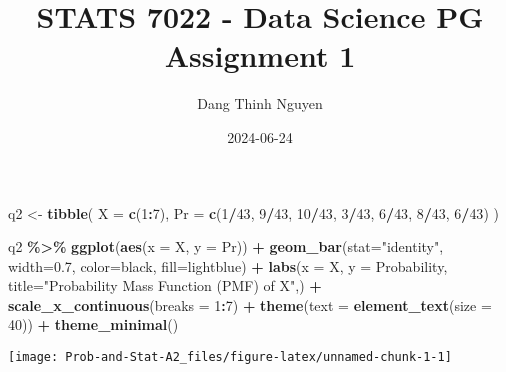 \documentclass[
]{article}
\title{STATS 7022 - Data Science PG Assignment 1}
\author{Dang Thinh Nguyen}
\date{2024-06-24}
\newenvironment{Shaded}{\begin{snugshade}}{\end{snugshade}}
\newcommand{\AttributeTok}[1]{\textcolor[rgb]{0.13,0.29,0.53}{#1}}
\newcommand{\DecValTok}[1]{\textcolor[rgb]{0.00,0.00,0.81}{#1}}
\newcommand{\FloatTok}[1]{\textcolor[rgb]{0.00,0.00,0.81}{#1}}
\newcommand{\FunctionTok}[1]{\textcolor[rgb]{0.13,0.29,0.53}{\textbf{#1}}}
\newcommand{\NormalTok}[1]{#1}
\newcommand{\OtherTok}[1]{\textcolor[rgb]{0.56,0.35,0.01}{#1}}
\newcommand{\SpecialCharTok}[1]{\textcolor[rgb]{0.81,0.36,0.00}{\textbf{#1}}}
\newcommand{\StringTok}[1]{\textcolor[rgb]{0.31,0.60,0.02}{#1}}
\begin{document}
\maketitle

\begin{Shaded}
\begin{Highlighting}[]
\NormalTok{q2 }\OtherTok{\textless{}{-}} \FunctionTok{tibble}\NormalTok{(}
  \AttributeTok{X =} \FunctionTok{c}\NormalTok{(}\DecValTok{1}\SpecialCharTok{:}\DecValTok{7}\NormalTok{),}
  \AttributeTok{Pr =} \FunctionTok{c}\NormalTok{(}\DecValTok{1}\SpecialCharTok{/}\DecValTok{43}\NormalTok{, }\DecValTok{9}\SpecialCharTok{/}\DecValTok{43}\NormalTok{, }\DecValTok{10}\SpecialCharTok{/}\DecValTok{43}\NormalTok{, }\DecValTok{3}\SpecialCharTok{/}\DecValTok{43}\NormalTok{, }\DecValTok{6}\SpecialCharTok{/}\DecValTok{43}\NormalTok{, }\DecValTok{8}\SpecialCharTok{/}\DecValTok{43}\NormalTok{, }\DecValTok{6}\SpecialCharTok{/}\DecValTok{43}\NormalTok{)}
\NormalTok{)}

\NormalTok{q2 }\SpecialCharTok{\%\textgreater{}\%}
  \FunctionTok{ggplot}\NormalTok{(}\FunctionTok{aes}\NormalTok{(}\AttributeTok{x =}\NormalTok{ X, }\AttributeTok{y =}\NormalTok{ Pr)) }\SpecialCharTok{+}
  \FunctionTok{geom\_bar}\NormalTok{(}\AttributeTok{stat=}\StringTok{"identity"}\NormalTok{, }\AttributeTok{width=}\FloatTok{0.7}\NormalTok{, }\AttributeTok{color=}\StringTok{\textquotesingle{}black\textquotesingle{}}\NormalTok{, }\AttributeTok{fill=}\StringTok{\textquotesingle{}lightblue\textquotesingle{}}\NormalTok{) }\SpecialCharTok{+}
  \FunctionTok{labs}\NormalTok{(}\AttributeTok{x =} \StringTok{\textquotesingle{}X\textquotesingle{}}\NormalTok{,}
       \AttributeTok{y =} \StringTok{\textquotesingle{}Probability\textquotesingle{}}\NormalTok{,}
       \AttributeTok{title=}\StringTok{"Probability Mass Function (PMF) of X"}\NormalTok{,) }\SpecialCharTok{+}
  \FunctionTok{scale\_x\_continuous}\NormalTok{(}\AttributeTok{breaks =} \DecValTok{1}\SpecialCharTok{:}\DecValTok{7}\NormalTok{) }\SpecialCharTok{+}
  \FunctionTok{theme}\NormalTok{(}\AttributeTok{text =} \FunctionTok{element\_text}\NormalTok{(}\AttributeTok{size =} \DecValTok{40}\NormalTok{)) }\SpecialCharTok{+}
  \FunctionTok{theme\_minimal}\NormalTok{()}
\end{Highlighting}
\end{Shaded}

\begin{center}\texttt{[image: Prob-and-Stat-A2\_files/figure-latex/unnamed-chunk-1-1]} \end{center}
\end{document}
